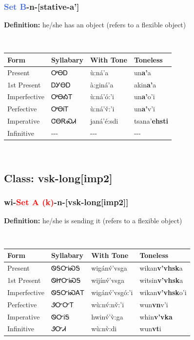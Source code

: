 \subsubsection*{\textcolor{RoyalBlue}{Set B}{-}\textbf{n}{-}[stative-a']}
\nopagebreak
\textbf{Definition: } he/she has an object (refers to a flexible object)
\\[0.5em]
\begin{tabularx}{\textwidth}{l X X X}%
\toprule%
\textbf{Form}&\textbf{Syllabary}&\textbf{With Tone}&\textbf{Toneless}\\%
\midrule%
Present&ᎤᎾᎠ&ù:ná’a&un\textbf{a'}a\\%
1st Present&ᎠᎩᎾᎠ&à:giná’a&akin\textbf{a'}a\\%
Imperfective&ᎤᎾᎣᎢ&ù:ná’ó:’i&un\textbf{a'}o'i\\%
Perfective&ᎤᎾᎥᎢ&ù:ná’v̌:’i&un\textbf{a'}v'i\\%
Imperative&ᏣᎾᎡᏍᏗ&janá’é:sdi&tsana'\textbf{ehsti}\\%
Infinitive&{-}{-}{-}&{-}{-}{-}&{-}{-}{-}\\%
\bottomrule%
\end{tabularx}
\\[1em]
\needspace{3in}
\subsection*{Class: vsk-long[imp2]}
\nopagebreak
\needspace{2in}
\subsubsection*{wi{-}\textcolor{Red}{Set A (k)}{-}\textbf{n}{-}[vsk-long[imp2]]}
\nopagebreak
\textbf{Definition: } he/she is sending it (refers to a flexible object)
\\[0.5em]
\begin{tabularx}{\textwidth}{l X X X}%
\toprule%
\textbf{Form}&\textbf{Syllabary}&\textbf{With Tone}&\textbf{Toneless}\\%
\midrule%
Present&ᏫᎦᏅᎥᏍᎦ&wigánv́’vsga&wikan\textbf{v'vhsk}a\\%
1st Present&ᏫᏥᏅᎥᏍᎦ&wijínv́’vsga&witsin\textbf{v'vhsk}a\\%
Imperfective&ᏫᎦᏅᎥᏍᎪᎢ&wigánv́’vsgó:’i&wikan\textbf{v'vhsk}o'i\\%
Perfective&ᏭᏅᏅᎢ&wù:nv́:nv̌:’i&wun\textbf{vn}v'i\\%
Imperative&ᏫᏅᎥᎦ&hwinv́’v̀:ga&whin\textbf{v'vka}\\%
Infinitive&ᏭᏅᏗ&wù:nv̀:di&wun\textbf{vt}i\\%
\bottomrule%
\end{tabularx}
\\[1em]